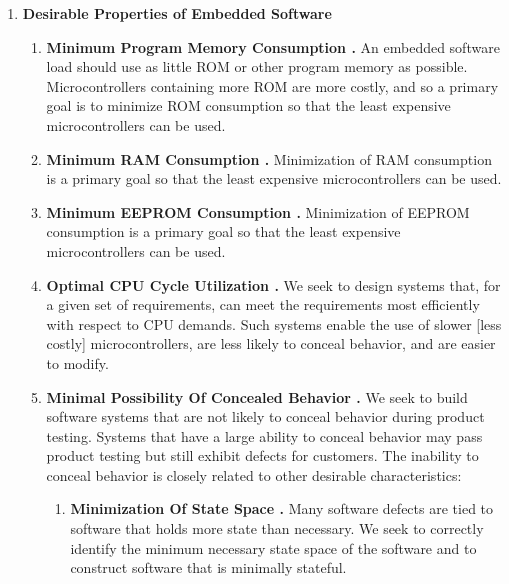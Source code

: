 \begin{enumerate}

\item \textbf{Desirable Properties of Embedded Software}

\begin{enumerate}

\item \textbf{Minimum Program Memory Consumption   
      \desirablepropertyemit\label{dp:chgr0:soda0:minpm}.} 
	  An embedded software load
      should use as little ROM or other program memory as possible.
	  Microcontrollers containing more ROM are more costly, and so
	  a primary goal is to minimize ROM consumption so that the
	  least expensive microcontrollers can be used.

\item \textbf{Minimum RAM Consumption 
      \desirablepropertyemit\label{dp:chgr0:soda0:minram}.}
	  Minimization of RAM
      consumption is a primary goal so that the least 
	  expensive microcontrollers can be used.

\item \textbf{Minimum EEPROM Consumption 
      \desirablepropertyemit\label{dp:chgr0:soda0:mineeprom}.}  
	  Minimization of 
      EEPROM consumption is a primary goal so that the least
	  expensive microcontrollers can be used.

\item \textbf{Optimal CPU Cycle Utilization
      \desirablepropertyemit\label{dp:chgr0:soda0:bestcpucycle}.}  
	  We seek to design
      systems that, for a given set of requirements, can 
      meet the requirements most efficiently with respect
      to CPU demands.  Such systems enable the use of slower [less costly]
      microcontrollers, are less likely to conceal behavior, 
	  and are easier to modify.

\item \textbf{Minimal Possibility Of Concealed Behavior
      \desirablepropertyemit\label{dp:chgr0:soda0:minpconcealedbeh}.}  
	  We seek to build
      software systems that are not likely to
      conceal behavior during product testing.  Systems that have a large
      ability to conceal behavior may pass product testing but
      still exhibit defects for customers.  The inability to conceal behavior
      is closely related to other desirable characteristics:

\begin{enumerate}

\item \textbf{Minimization Of State Space 
      \desirablepropertyemit\label{dp:chgr0:soda0:minss}.}  
	  Many software defects are tied to
      software that holds more state than necessary.  We seek to correctly
      identify the minimum necessary state space of the software and to
	  construct software that is minimally stateful.


\end{enumerate}
\end{enumerate}
\end{enumerate}
